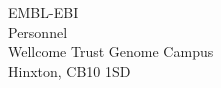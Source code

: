 \begin{letter}{EMBL-EBI \\Personnel \\Wellcome Trust Genome Campus \\Hinxton, CB10 1SD}






\end{letter}


